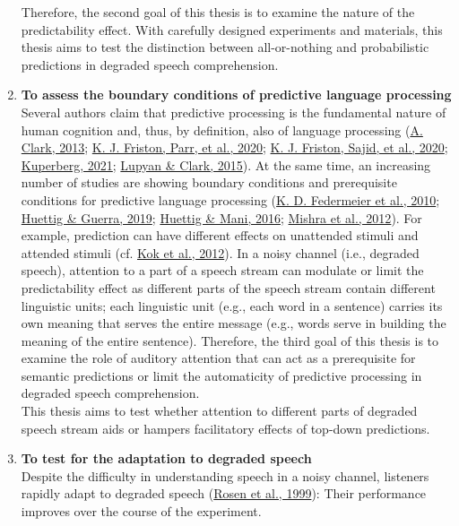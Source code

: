 \documentclass[a4paper, nobind]{templates/ociamthesis}
\begin{document}
\begin{enumerate}
  Therefore, the second goal of this thesis is to examine the nature of the predictability effect.
  With carefully designed experiments and materials, this thesis aims to test the distinction between all-or-nothing and probabilistic predictions in degraded speech comprehension.
\item
  \textbf{To assess the boundary conditions of predictive language processing}\\
  Several authors claim that predictive processing is the fundamental nature of human cognition and, thus, by definition, also of language processing (\protect\hyperlink{ref-Clark2013}{A. Clark, 2013}; \protect\hyperlink{ref-Friston2020}{K. J. Friston, Parr, et al., 2020}; \protect\hyperlink{ref-Friston2020b}{K. J. Friston, Sajid, et al., 2020}; \protect\hyperlink{ref-Kuperberg2020}{Kuperberg, 2021}; \protect\hyperlink{ref-Lupyan2015}{Lupyan \& Clark, 2015}).
  At the same time, an increasing number of studies are showing boundary conditions and prerequisite conditions for predictive language processing (\protect\hyperlink{ref-Federmeier2010}{K. D. Federmeier et al., 2010}; \protect\hyperlink{ref-Huettig2019}{Huettig \& Guerra, 2019}; \protect\hyperlink{ref-Huettig2016}{Huettig \& Mani, 2016}; \protect\hyperlink{ref-Mishra2012}{Mishra et al., 2012}).
  For example, prediction can have different effects on unattended stimuli and attended stimuli (cf. \protect\hyperlink{ref-Kok2012}{Kok et al., 2012}).
  In a noisy channel (i.e., degraded speech), attention to a part of a speech stream can modulate or limit the predictability effect as different parts of the speech stream contain different linguistic units;
  each linguistic unit (e.g., each word in a sentence) carries its own meaning that serves the entire message (e.g., words serve in building the meaning of the entire sentence).
  Therefore, the third goal of this thesis is to examine the role of auditory attention that can act as a prerequisite for semantic predictions
  or limit the automaticity of predictive processing in degraded speech comprehension.\\
  This thesis aims to test whether attention to different parts of degraded speech stream aids or hampers facilitatory effects of top-down predictions.
\item
  \textbf{To test for the adaptation to degraded speech}\\
  Despite the difficulty in understanding speech in a noisy channel,
  listeners rapidly adapt to degraded speech (\protect\hyperlink{ref-Rosen1999}{Rosen et al., 1999}):
  Their performance improves over the course of the experiment.

\end{enumerate}
\end{document}
